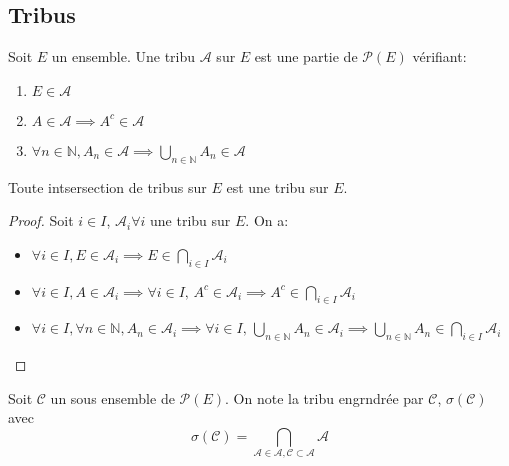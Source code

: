 
\subsection{Tribus}


\begin{definition}[Tribu]
	Soit $E$ un ensemble. Une tribu $\mathscr{A}$ sur $E$ est une partie de $\mathscr{P}(E)$ vérifiant:
	\begin{enumerate}
		\item $E \in \mathscr{A}$
		\item $A \in \mathscr{A} \implies A^c \in \mathscr{A}$
		\item $ \forall n \in \mathbb{N}, A_n \in \mathscr{A} \implies \bigcup\limits_{n \in \mathbb{N}} A_n \in \mathscr{A}$
	\end{enumerate}
\end{definition}


\begin{prop}
	Toute intsersection de tribus sur $E$ est une tribu sur $E$.
\end{prop}

\begin{proof}
	Soit $i \in I$, $\mathscr{A}_i \forall i$ une tribu sur $E$. On a:
	\begin{itemize}
		\item $\forall  i \in I, E \in \mathscr{A}_i \implies E \in \bigcap\limits_{i \in I} \mathscr{A}_i$
		\item $\forall i \in I, A \in \mathscr{A}_i \implies \forall i \in I, \, A^c \in \mathscr{A}_i
			      \implies A^c \in \bigcap\limits_{i \in I} \mathscr{A}_i$
		\item $\forall i \in I, \forall n \in \mathbb{N}, A_n \in \mathscr{A}_i \implies
			      \forall i \in I, \,\bigcup\limits_{n \in \mathbb{N}} A_n \in \mathscr{A}_i \implies
			      \bigcup\limits_{n \in \mathbb{N}} A_n \in \bigcap\limits_{i \in I} \mathscr{A}_i$
	\end{itemize}
\end{proof}

\begin{definition}
	Soit $\mathscr{C}$ un sous ensemble de $\mathscr{P}(E)$. On note la tribu
	engrndrée par $\mathscr{C}$, $\sigma(\mathscr{C})$ avec
	\begin{equation*}
		\sigma(\mathscr{C}) = \bigcap\limits_{\mathscr{A} \in \mathscr{A}, \mathscr{C} \subset \mathscr{A}} \mathscr{A}
	\end{equation*}
\end{definition}

